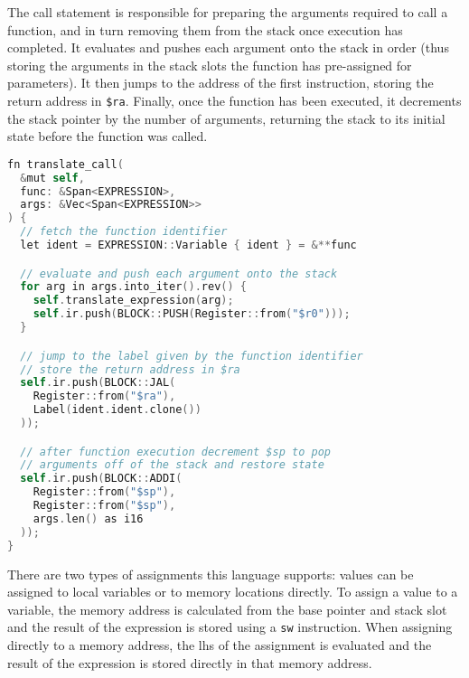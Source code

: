 The call statement is responsible for preparing the arguments required to call a function, and in turn removing them from the stack once execution has completed. It evaluates and pushes each argument onto the stack in order (thus storing the arguments in the stack slots the function has pre-assigned for parameters). It then jumps to the address of the first instruction, storing the return address in \texttt{\$ra}. Finally, once the function has been executed, it decrements the stack pointer by the number of arguments, returning the stack to its initial state before the function was called. 

\begin{lstlisting}[language=C]
fn translate_call(
  &mut self, 
  func: &Span<EXPRESSION>, 
  args: &Vec<Span<EXPRESSION>>
) {
  // fetch the function identifier
  let ident = EXPRESSION::Variable { ident } = &**func 

  // evaluate and push each argument onto the stack 
  for arg in args.into_iter().rev() {
    self.translate_expression(arg);
    self.ir.push(BLOCK::PUSH(Register::from("$r0")));
  }

  // jump to the label given by the function identifier
  // store the return address in $ra
  self.ir.push(BLOCK::JAL(
    Register::from("$ra"), 
    Label(ident.ident.clone())
  ));

  // after function execution decrement $sp to pop 
  // arguments off of the stack and restore state
  self.ir.push(BLOCK::ADDI(
    Register::from("$sp"), 
    Register::from("$sp"), 
    args.len() as i16
  ));
}
\end{lstlisting}

There are two types of assignments this language supports: values can be assigned to local variables or to memory locations directly. To assign a value to a variable, the memory address is calculated from the base pointer and stack slot and the result of the expression is stored using a \texttt{sw} instruction. When assigning directly to a memory address, the lhs of the assignment is evaluated and the result of the expression is stored directly in that memory address. 

